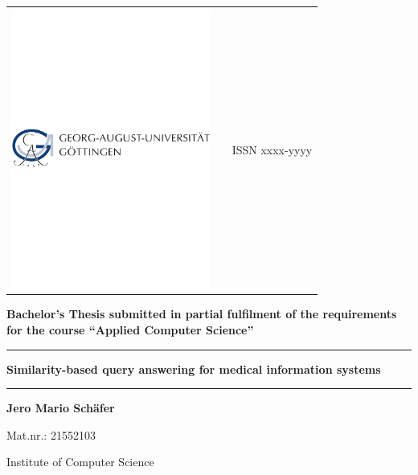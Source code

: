 
\newcommand{\Rule}{\rule{\textwidth}{1mm}}

\begin{titlepage}
    \singlespacing

    \normalsize
    \begin{tabularx}{\textwidth}{lXr}
        \includegraphics[width=6.5cm]{img/ugo-logo.pdf} & & ISSN xxxx-yyyy\\
    \end{tabularx}

    \vspace{1cm}
    
    \centering
    \sffamily\bfseries\LARGE Bachelor's Thesis
    submitted in partial fulfilment of the
    requirements for the course ``Applied Computer Science''

    \vspace{1mm}

    \Rule\vspace{5mm}
    \sffamily\bfseries\Huge
        Similarity-based query answering for medical information systems
    \vspace{1mm}\Rule

    \vspace{1.5cm}

    \sffamily\bfseries\Large Jero Mario Schäfer\par Mat.nr.: 21552103\par
    \vspace{0.5cm}
    Institute of Computer Science

    \vspace{1.5cm}


\end{titlepage}
